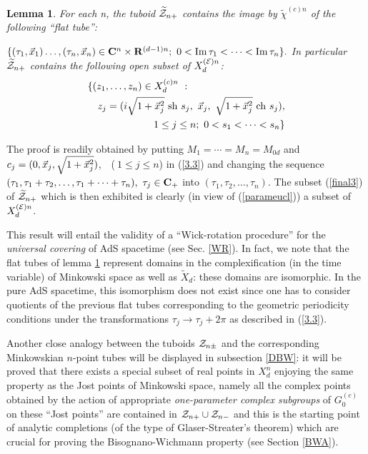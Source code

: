\documentclass[a4paper,a4paper]{article}
\newtheorem{lemma}{Lemma}[section]
\def\bC{{\bf C}}
\def\bR{{\bf R}}
\def\Im{{\rm Im\,}}
\def\EE{{\cal E}}
\def\ZZ{{\cal Z}}
\def\wt{\widetilde}
\begin{document}
\begin{lemma}
\label{tubeucl}
For each n, the tuboid $\wt \ZZ_{n+}$
contains the image by $\wt \chi^{(c) n}$
of the following ``flat tube'':

\noindent
$\{(\tau_1,\vec x_1)\ldots,(\tau_n,\vec x_n) \in
{\bf C}^n \times \bR^{(d-1)n};\ 0< \Im \tau_1 < \cdots <\Im \tau_n\}.$
In particular
$\wt \ZZ_{n+}$
contains the following open subset of
$X_d^{(\EE) n}$:
\begin{eqnarray}
\lefteqn{
\{(z_1,\ldots,z_n) \in X_d^{(c) n}\ :}\nonumber\\
&&z_j = (i\sqrt {1+ \vec x_j^2}\  {\rm sh} \ s_j,\  \vec x_j,\
\sqrt {1+ \vec x_j^2}\  {\rm ch} \ s_j),\nonumber\\
&&\ 1 \le j \le n;\
0< s_1<\cdots < s_n \}
\label{final3} \end{eqnarray}
\end{lemma}
The proof is readily obtained by putting
$M_1 = \cdots = M_n = M_{0d}$ and $c_j =
(0,  \vec x_j, \linebreak[0]
\sqrt {1+ \vec x_j^2})$,\ \ ($\ 1 \le j \le n$) in (\ref{3.3})
and changing the sequence
$(\tau_1, \tau_1 +\tau_2,\ldots, \tau_1 +\cdots +\tau_n),\ \tau_j \in
\bC_+$
into  $(\tau_1, \tau_2,\ldots, \tau_n) $.
The subset (\ref{final3}) of $\wt \ZZ_{n+}$ which is then exhibited
is clearly (in view of (\ref{parameucl})) a subset of
$X_d^{(\EE) n}$.

This result will  entail the validity of a ``Wick-rotation procedure''
for the {\sl universal covering } of AdS spacetime
(see Sec. \ref{WR}). In fact, we note that
the flat tubes of lemma \ref{tubeucl} represent
domains in the complexification (in the time variable) of
Minkowski space as well as $\wt X_d$: these domains are isomorphic.
In the pure AdS spacetime, this isomorphism does not exist since
one has to consider quotients of the
previous flat tubes corresponding to  the geometric periodicity
conditions under the transformations $\tau_j \to \tau_j +2\pi$
as described in (\ref {3.3}).

\vskip 0.2cm
Another close analogy between the tuboids $\ZZ_{n\pm}$ and
the corresponding Minkow\-skian $n$-point tubes will be displayed
in subsection \ref{DBW}: it will be proved that there exists
a special subset of real points in $X_d^n$ enjoying the same property
as the Jost points of Minkowski space, namely all the complex points
obtained by the action of appropriate {\sl one-parameter complex subgroups}
of $G_0^{(c)}$ on these ``Jost points'' are  contained in
$\ZZ_{n+}
\cup \ZZ_{n-}$ and this is the starting point of analytic completions
(of the type of Glaser-Streater's theorem) which are crucial for
proving the Bisognano-Wichmann property (see Section \ref{BWA}).
\end{document}
